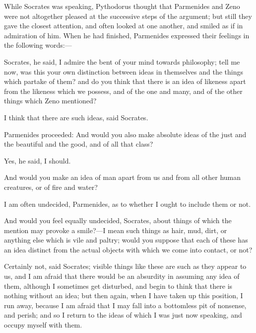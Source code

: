 \documentclass[11pt,letter]{article}
\begin{document}
\par  While Socrates was speaking, Pythodorus thought that Parmenides and Zeno were not altogether pleased at the successive steps of the argument; but still they gave the closest attention, and often looked at one another, and smiled as if in admiration of him. When he had finished, Parmenides expressed their feelings in the following words:—

\par  Socrates, he said, I admire the bent of your mind towards philosophy; tell me now, was this your own distinction between ideas in themselves and the things which partake of them? and do you think that there is an idea of likeness apart from the likeness which we possess, and of the one and many, and of the other things which Zeno mentioned?

\par  I think that there are such ideas, said Socrates.

\par  Parmenides proceeded: And would you also make absolute ideas of the just and the beautiful and the good, and of all that class?

\par  Yes, he said, I should.

\par  And would you make an idea of man apart from us and from all other human creatures, or of fire and water?

\par  I am often undecided, Parmenides, as to whether I ought to include them or not.

\par  And would you feel equally undecided, Socrates, about things of which the mention may provoke a smile?—I mean such things as hair, mud, dirt, or anything else which is vile and paltry; would you suppose that each of these has an idea distinct from the actual objects with which we come into contact, or not?

\par  Certainly not, said Socrates; visible things like these are such as they appear to us, and I am afraid that there would be an absurdity in assuming any idea of them, although I sometimes get disturbed, and begin to think that there is nothing without an idea; but then again, when I have taken up this position, I run away, because I am afraid that I may fall into a bottomless pit of nonsense, and perish; and so I return to the ideas of which I was just now speaking, and occupy myself with them.
\end{document}
